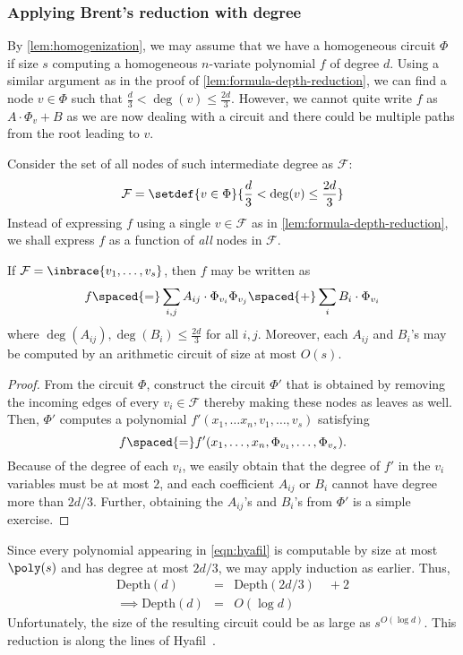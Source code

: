 \subsubsection{Applying Brent's reduction with degree}

By \autoref{lem:homogenization}, we may assume that we have a homogeneous circuit $\Phi$ if size $s$ computing a homogeneous $n$-variate polynomial $f$ of degree $d$. 
Using a similar argument as in the proof of \autoref{lem:formula-depth-reduction}, we can find a node $v \in \Phi$ such that $\frac{d}{3} < \deg(v) \leq \frac{2d}{3}$. 
However, we cannot quite write $f$ as $A \cdot \Phi_v + B$ as we are now dealing with a circuit and there could be multiple paths from the root leading to $v$.

Consider the set of all nodes of such intermediate degree as $\mathcal{F}$:
\[
\mathcal{F} = \setdef{v\in \Phi}{\frac{d}{3} < \deg(v)\leq \frac{2d}{3}}
\]
Instead of expressing $f$ using a single $v\in \mathcal{F}$ as in \autoref{lem:formula-depth-reduction}, we shall express $f$ as a function of \emph{all} nodes in $\mathcal{F}$. 

\begin{claim}
If $\mathcal{F} = \inbrace{v_1,\dots, v_s}$, then $f$ may be written as
\begin{equation}\label{eqn:hyafil}
f \spaced{=} \sum_{i,j} A_{ij} \cdot \Phi_{v_i} \Phi_{v_j} \spaced{+} \sum_i B_i \cdot \Phi_{v_i}
\end{equation}
where $\deg(A_{ij}), \deg(B_i) \leq \frac{2d}{3}$ for all $i,j$. 
Moreover, each $A_{ij}$ and $B_i$'s may be computed by an arithmetic circuit of size at most $O(s)$. 
\end{claim}
\begin{proof}
From the circuit $\Phi$, construct the circuit $\Phi'$ that is obtained by removing the incoming edges of every $v_i \in \mathcal{F}$ thereby making these nodes as leaves as well. 
Then, $\Phi'$ computes a polynomial $f'(x_1,\dots x_n, v_1,\dots, v_s)$ satisfying 
\[
f \spaced{=} f'(x_1,\dots, x_n, \Phi_{v_1},\dots, \Phi_{v_s}).
\]
Because of the degree of each $v_i$, we easily obtain that the degree of $f'$ in the $v_i$ variables must be at most $2$, and each coefficient $A_{ij}$ or $B_i$ cannot have degree more than $2d/3$. 
Further, obtaining the $A_{ij}$'s and $B_i$'s from $\Phi'$ is a simple exercise. 
\end{proof}

Since every polynomial appearing in \eqref{eqn:hyafil} is computable by size at most $\poly(s)$ and has degree at most $2d/3$, we may apply induction as earlier. 
Thus,
\begin{eqnarray*}
\mathrm{Depth}(d) & = & \mathrm{Depth}(2d/3) \quad + 2\\
\implies \mathrm{Depth}(d) & = & O(\log d)
\end{eqnarray*}
Unfortunately, the size of the resulting circuit could be as large as $s^{O(\log d)}$. 
This reduction is along the lines of Hyafil~\cite{Hyafil1978}. 

